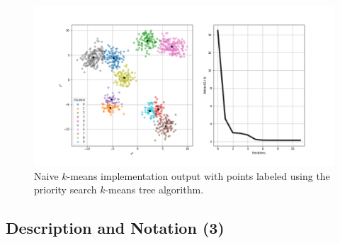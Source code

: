 \begin{frame}
	
	\begin{figure}
		\centering
		\includegraphics[width=1.0\linewidth]{../images/flann/kmeans_test}
		\caption{\footnotesize Naive $k$-means implementation output with points labeled using the priority search $k$-means tree algorithm.}
		\label{fig:km_example}
	\end{figure}
	
\end{frame}

\subsection{Description and Notation (3)}

